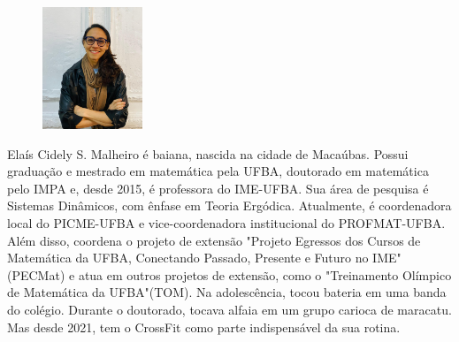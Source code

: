 \documentclass{hipatia}
\begin{document}
\vspace{2cm}
\begin{figure}
	\vspace{-10pt}
	\centering
	\includegraphics[width=3cm]{Elais.jpeg}
\end{figure}\noindent
Elaís Cidely S. Malheiro é baiana, nascida na cidade de Macaúbas. Possui graduação e mestrado em matemática pela UFBA, doutorado em matemática pelo IMPA e, desde 2015, é professora do IME-UFBA. Sua área de pesquisa é Sistemas Dinâmicos, com ênfase em Teoria Ergódica. Atualmente, é coordenadora local do PICME-UFBA e vice-coordenadora institucional do PROFMAT-UFBA. Além disso, coordena o projeto de extensão "Projeto Egressos dos Cursos de Matemática da UFBA, Conectando Passado, Presente e Futuro no IME"(PECMat) e atua em outros projetos de extensão, como o "Treinamento Olímpico de Matemática da UFBA"(TOM). Na adolescência,  tocou bateria em uma banda do colégio. Durante o doutorado, tocava alfaia em um grupo carioca de maracatu. Mas desde 2021, tem o CrossFit como parte indispensável da sua rotina.
\end{document}
